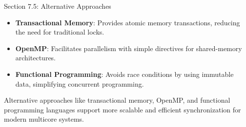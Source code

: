 \begin{notes}{Section 7.5: Alternative Approaches}
\begin{highlight}
    \end{highlight}
    
    \begin{highlight}
    
        \begin{itemize}
            \item \textbf{Transactional Memory}: Provides atomic memory transactions, reducing the need for traditional locks.
            \item \textbf{OpenMP}: Facilitates parallelism with simple directives for shared-memory architectures.
            \item \textbf{Functional Programming}: Avoids race conditions by using immutable data, simplifying concurrent programming.
        \end{itemize}
    
    Alternative approaches like transactional memory, OpenMP, and functional programming languages support more scalable and efficient synchronization for modern multicore systems.
    
    \end{highlight}
\end{notes}